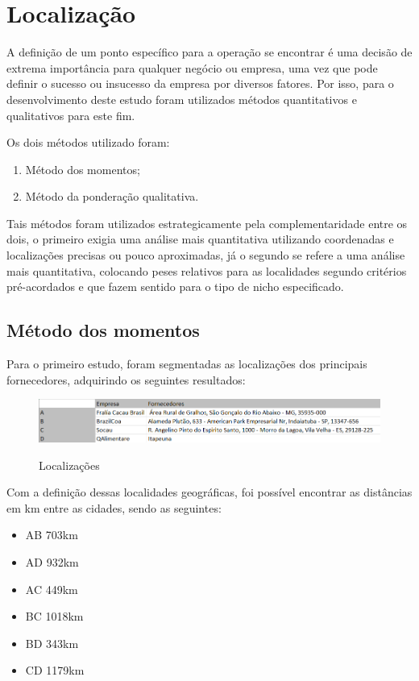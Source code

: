 \documentclass[
	12pt,				%
	openright,			%
	oneside,			%
	a4paper,			%
	english,			%
	french,				%
	spanish,			%
	brazil				%
	]{abntex2}
\begin{document}
\chapter{Localização}

A definição de um ponto específico para a operação se encontrar é uma decisão de extrema importância para qualquer negócio ou empresa, uma vez que pode definir o sucesso ou insucesso da empresa por diversos fatores. Por isso, para o desenvolvimento deste estudo foram utilizados métodos quantitativos e qualitativos para este fim.

Os dois métodos utilizado foram:

\begin{enumerate}
\item Método dos momentos;
\item Método da ponderação qualitativa.
\end{enumerate}

Tais métodos foram utilizados estrategicamente pela complementaridade entre os dois, o primeiro exigia uma análise mais quantitativa utilizando coordenadas e localizações precisas ou pouco aproximadas, já o  segundo se refere a uma análise mais quantitativa, colocando peses relativos para as localidades segundo critérios pré-acordados e que fazem sentido para o tipo de nicho especificado.

\section{Método dos momentos}

Para o primeiro estudo, foram segmentadas as localizações dos principais fornecedores, adquirindo os seguintes resultados:

\begin{figure}[H]
\begin{center}
\caption{Localizações}
\includegraphics[scale=0.5]{../../Pictures/tabela1.png} 
\label{loca}
\end{center}
\end{figure}

Com a definição dessas localidades geográficas, foi possível encontrar as distâncias em km entre as cidades, sendo as seguintes:

\begin{itemize}
\item AB 703km  
\item AD 932km
\item AC 449km
\item BC 1018km
\item BD 343km
\item CD 1179km
\end{itemize}
\end{document}
